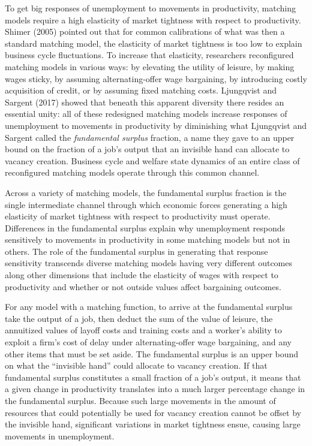  To get big responses of unemployment to movements
in productivity, matching models require a high elasticity of market
tightness %
with respect to
productivity.  Shimer (2005) pointed out  that
for common calibrations of what was then a standard matching model, the elasticity
of market tightness is too low to explain business cycle fluctuations.
To increase that elasticity, researchers  reconfigured
matching models in various ways:  by elevating the utility
of leisure, by making wages sticky, by assuming alternating-offer wage
bargaining, by introducing costly acquisition of credit, or by
assuming fixed matching costs.  Ljungqvist and Sargent (2017) showed that beneath this apparent
diversity there resides an essential unity: all of these redesigned  matching models increase responses of
unemployment to movements in productivity by diminishing what Ljungqvist and Sargent called the
{\it fundamental surplus} fraction, a name they gave  to an upper bound
on the fraction of a job's output that an invisible hand
can allocate to vacancy creation. Business cycle and
welfare state dynamics of an entire class of reconfigured matching
models  operate through this common channel.


Across a variety of matching models, the fundamental surplus fraction is the
single intermediate channel through which economic forces
generating a high elasticity of market tightness with
respect to productivity must operate.  Differences in the  fundamental surplus
explain  why unemployment responds sensitively to
movements in productivity in some matching models but not in
others. The role of the fundamental surplus in generating that response sensitivity
transcends diverse matching models having
very different outcomes along other dimensions that include the elasticity of
wages with respect to productivity %
and
whether or not outside values affect bargaining outcomes.




For any model with a matching function,  to arrive at the fundamental surplus take the output of a job, then deduct the
sum of the value of leisure,
the annuitized values of layoff costs and training costs and a worker's
ability to exploit a firm's cost of delay under
alternating-offer wage bargaining, and  any other items that must
be set aside. The fundamental surplus is an
upper bound on what the ``invisible hand'' could allocate
to vacancy creation. If that fundamental surplus constitutes
a small fraction of a job's output, it means that a given change
in productivity translates into a  much larger percentage
change in the fundamental surplus. Because such large movements in the
amount of resources that could potentially be used for vacancy
creation cannot be offset by the invisible hand,
significant variations in market tightness ensue,  causing large
movements in unemployment.

